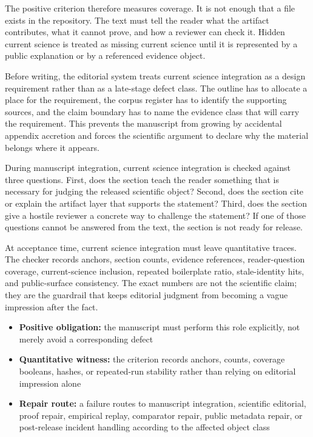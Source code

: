 The positive criterion therefore measures coverage. It is not enough that a file exists in the repository. The text must tell the reader what the artifact contributes, what it cannot prove, and how a reviewer can check it. Hidden current science is treated as missing current science until it is represented by a public explanation or by a referenced evidence object.


Before writing, the editorial system treats current science integration as a design requirement rather than as a late-stage defect class. The outline has to allocate a place for the requirement, the corpus register has to identify the supporting sources, and the claim boundary has to name the evidence class that will carry the requirement. This prevents the manuscript from growing by accidental appendix accretion and forces the scientific argument to declare why the material belongs where it appears.


During manuscript integration, current science integration is checked against three questions. First, does the section teach the reader something that is necessary for judging the released scientific object? Second, does the section cite or explain the artifact layer that supports the statement? Third, does the section give a hostile reviewer a concrete way to challenge the statement? If one of those questions cannot be answered from the text, the section is not ready for release.


At acceptance time, current science integration must leave quantitative traces. The checker records anchors, section counts, evidence references, reader-question coverage, current-science inclusion, repeated boilerplate ratio, stale-identity hits, and public-surface consistency. The exact numbers are not the scientific claim; they are the guardrail that keeps editorial judgment from becoming a vague impression after the fact.


\begin{itemize}[leftmargin=1.8em]

\item \textbf{Positive obligation:} the manuscript must perform this role explicitly, not merely avoid a corresponding defect

\item \textbf{Quantitative witness:} the criterion records anchors, counts, coverage booleans, hashes, or repeated-run stability rather than relying on editorial impression alone

\item \textbf{Repair route:} a failure routes to manuscript integration, scientific editorial, proof repair, empirical replay, comparator repair, public metadata repair, or post-release incident handling according to the affected object class

\end{itemize}

